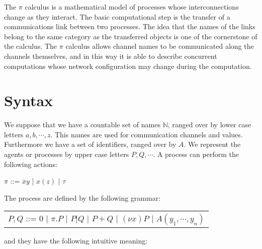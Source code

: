 
The $\pi$ calculus is a mathematical model of processes whose interconnections change as they interact. The basic computational step is the transfer of a communications link between two processes. The idea that the names of the links belong to the same category as the transferred objects is one of the cornerstone of the calculus. The $\pi$ calculus allows channel names to be communicated along the channels themselves, and in this way it is able to describe concurrent computations whose network configuration may change during the computation.


\section{Syntax}
We suppose that we have a countable set of names $\mathbb{N}$, ranged over by lower case letters $a,b, \cdots, z$. This names are used for communication channels and values. Furthermore we have a set of identifiers, ranged over by $A$. We represent the agents or processes by upper case letters $P,Q, \cdots $. A process can perform the following actions:
\begin{center}
  $\pi$ ::= $\overline{x}y$ | $x(z)$ | $\tau$ 
\end{center}
The process are defined by the following grammar:
\begin{center}
  \begin{tabular}{l}
    $P,Q$ ::= $0$ | $\pi.P$ | $P|Q$ | $P+Q$ | $(\nu x) P$ | $A(y_{1}, \cdots, y_{n})$ 
  \end{tabular}
\end{center}
and they have the following intuitive meaning:
